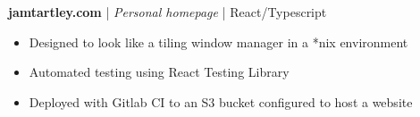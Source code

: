 \textbf{jamtartley.com} | \textit{Personal homepage} | {React/Typescript}
\begin{itemize}
    \item Designed to look like a tiling window manager in a *nix environment
    \item Automated testing using React Testing Library
    \item Deployed with Gitlab CI to an S3 bucket configured to host a website
\end{itemize}
